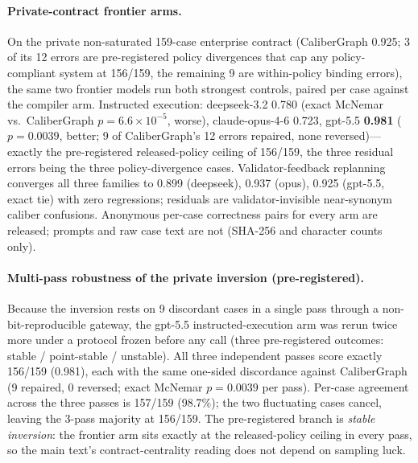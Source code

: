 \documentclass[letterpaper]{article}
\begin{document}
\paragraph{Private-contract frontier arms.}
On the private non-saturated 159-case enterprise contract (CaliberGraph 0.925; 3 of its 12 errors are pre-registered policy divergences that cap any policy-compliant system at 156/159, the remaining 9 are within-policy binding errors), the same two frontier models run both strongest controls, paired per case against the compiler arm. Instructed execution: deepseek-3.2 0.780 (exact McNemar vs.\ CaliberGraph $p{=}6.6{\times}10^{-5}$, worse), claude-opus-4-6 0.723, gpt-5.5 \textbf{0.981} ($p{=}0.0039$, better; 9 of CaliberGraph's 12 errors repaired, none reversed)---exactly the pre-registered released-policy ceiling of 156/159, the three residual errors being the three policy-divergence cases. Validator-feedback replanning converges all three families to 0.899 (deepseek), 0.937 (opus), 0.925 (gpt-5.5, exact tie) with zero regressions; residuals are validator-invisible near-synonym caliber confusions. Anonymous per-case correctness pairs for every arm are released; prompts and raw case text are not (SHA-256 and character counts only).

\paragraph{Multi-pass robustness of the private inversion (pre-registered).}
Because the inversion rests on 9 discordant cases in a single pass through a non-bit-reproducible gateway, the gpt-5.5 instructed-execution arm was rerun twice more under a protocol frozen before any call (three pre-registered outcomes: stable / point-stable / unstable). All three independent passes score exactly 156/159 (0.981), each with the same one-sided discordance against CaliberGraph (9 repaired, 0 reversed; exact McNemar $p{=}0.0039$ per pass). Per-case agreement across the three passes is 157/159 (98.7\%); the two fluctuating cases cancel, leaving the 3-pass majority at 156/159. The pre-registered branch is \emph{stable inversion}: the frontier arm sits exactly at the released-policy ceiling in every pass, so the main text's contract-centrality reading does not depend on sampling luck.
\end{document}
